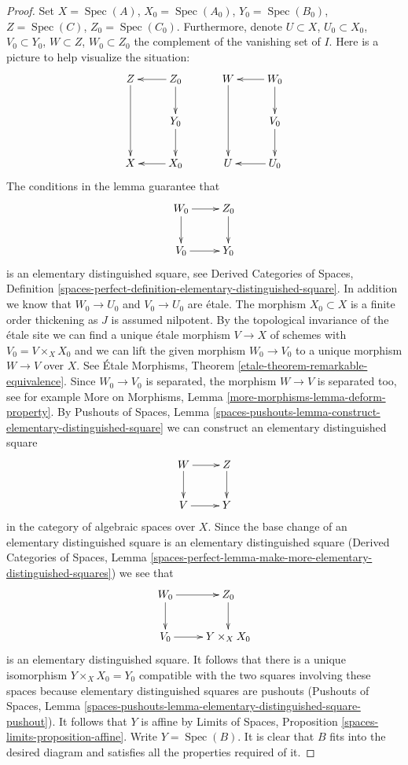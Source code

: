 \documentclass{stacks-project}
\theoremstyle{plain}
\theoremstyle{definition}
\theoremstyle{remark}
\numberwithin{equation}{subsection}
\def\Spec{\mathop{\mathrm{Spec}}}
\begin{document}
\begin{proof}
Set $X = \Spec(A)$, $X_0 = \Spec(A_0)$, $Y_0 = \Spec(B_0)$,
$Z = \Spec(C)$, $Z_0 = \Spec(C_0)$. Furthermore, denote
$U \subset X$, $U_0 \subset X_0$, $V_0 \subset Y_0$,
$W \subset Z$, $W_0 \subset Z_0$ the complement of the
vanishing set of $I$. Here is a picture to help visualize the
situation:
$$
\xymatrix{
Z \ar[dd] & Z_0 \ar[l] \ar[d] \\
& Y_0 \ar[d] \\
X & X_0 \ar[l]
}
\quad\quad\quad
\xymatrix{
W \ar[dd] & W_0 \ar[l] \ar[d] \\
& V_0 \ar[d] \\
U & U_0 \ar[l]
}
$$
The conditions in the lemma guarantee that
$$
\xymatrix{
W_0 \ar[r] \ar[d] & Z_0 \ar[d] \\
V_0 \ar[r] & Y_0
}
$$
is an elementary distinguished square, see
Derived Categories of Spaces, Definition
\ref{spaces-perfect-definition-elementary-distinguished-square}.
In addition we know that
$W_0 \to U_0$ and $V_0 \to U_0$ are \'etale. The morphism
$X_0 \subset X$ is a finite order thickening as $J$ is assumed nilpotent.
By the topological invariance of the \'etale site
we can find a unique \'etale morphism $V \to X$ of schemes
with $V_0 = V \times_X X_0$ and we can lift the given morphism
$W_0 \to V_0$ to a unique morphism $W \to V$ over $X$.
See \'Etale Morphisms, Theorem
\ref{etale-theorem-remarkable-equivalence}.
Since $W_0 \to V_0$ is separated, the morphism $W \to V$ is separated too,
see for example
More on Morphisms, Lemma \ref{more-morphisms-lemma-deform-property}.
By Pushouts of Spaces, Lemma
\ref{spaces-pushouts-lemma-construct-elementary-distinguished-square}
we can construct an elementary distinguished square
$$
\xymatrix{
W \ar[r] \ar[d] & Z \ar[d] \\
V \ar[r] & Y
}
$$
in the category of algebraic spaces over $X$. Since the base change
of an elementary distinguished square is an elementary distinguished
square (Derived Categories of Spaces, Lemma
\ref{spaces-perfect-lemma-make-more-elementary-distinguished-squares})
we see that
$$
\xymatrix{
W_0 \ar[r] \ar[d] & Z_0 \ar[d] \\
V_0 \ar[r] & Y \times_X X_0
}
$$
is an elementary distinguished square. It follows that there is a
unique isomorphism $Y \times_X X_0 = Y_0$ compatible with the two
squares involving these spaces because
elementary distinguished squares are pushouts (Pushouts of Spaces, Lemma
\ref{spaces-pushouts-lemma-elementary-distinguished-square-pushout}).
It follows that $Y$ is affine by
Limits of Spaces, Proposition \ref{spaces-limits-proposition-affine}.
Write $Y = \Spec(B)$. It is clear that $B$ fits into the desired diagram
and satisfies all the properties required of it.
\end{proof}
\end{document}
